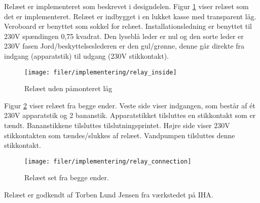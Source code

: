 
Relæet er implementeret som beskrevet i designdelen. Figur \ref{lab:Relay_inside} viser relæet som det er implementeret. Relæet er indbygget i en lukket kasse med transparent låg. 
Veroboard er benyttet som sokkel for relæet. Installationsledning er benyttet til 230V spændingen 0,75 kvadrat.
Den lyseblå leder er nul og den sorte leder er 230V fasen 
Jord/beskyttelseslederen er den gul/grønne, denne går direkte fra indgang (apparatstik) til udgang (230V stikkontakt). 
  


\begin{figure}[htb]
\centering
{\texttt{[image: filer/implementering/relay\_inside]}}
\caption{Relæet uden påmonteret låg}
\label{lab:Relay_inside}
\end{figure}

Figur \ref{lab:Relay_connection} viser relæet fra begge ender. Veste side viser indgangen, som består af ét 230V apparatstik og 2 bananstik. Apparatstikket tilsluttes en stikkontakt som er tændt. Bananstikkene tilsluttes tilslutningsprintet. Højre side viser 230V stikkontakten som tændes/slukkes af relæet. Vandpumpen tilsluttes denne stikkontakt.

\begin{figure}[htb]
\centering
{\texttt{[image: filer/implementering/relay\_connection]}}
\caption{Relæet set fra begge ender.}
\label{lab:Relay_connection}
\end{figure}

Relæet er godkendt af Torben Lund Jensen fra værkstedet på IHA.